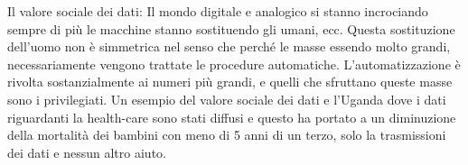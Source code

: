 \documentclass[]{article}
\begin{document}
Il valore sociale dei dati: Il mondo digitale e analogico si stanno
incrociando sempre di più le macchine stanno sostituendo gli umani, ecc.
Questa sostituzione dell'uomo non è simmetrica nel senso che perché le
masse essendo molto grandi, necessariamente vengono trattate le
procedure automatiche. L'automatizzazione è rivolta sostanzialmente ai
numeri più grandi, e quelli che sfruttano queste masse sono i
privilegiati. Un esempio del valore sociale dei dati e l'Uganda dove i
dati riguardanti la health-care sono stati diffusi e questo ha portato a
un diminuzione della mortalità dei bambini con meno di 5 anni di un
terzo, solo la trasmissioni dei dati e nessun altro aiuto.
\end{document}

